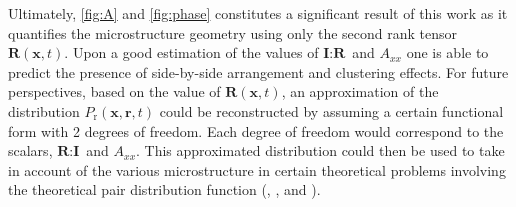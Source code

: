 Ultimately, \ref{fig:A} and \ref{fig:phase} constitutes a significant result of this work as it quantifies the microstructure geometry using only the second rank tensor $\textbf{R}(\textbf{x},t)$.
Upon a good estimation of the values of $\textbf{I}:\textbf{R}$ and $A_{xx}$ one is able to predict the presence of side-by-side arrangement and clustering effects. 
For future perspectives, based on the value of $\textbf{R}(\textbf{x},t)$, an approximation of the distribution $P_\text{r}(\textbf{x},\textbf{r},t)$ could be reconstructed by assuming a certain functional form with 2 degrees of freedom.
Each degree of freedom would correspond to the scalars, $\textbf{R}:\textbf{I}$ and $A_{xx}$.
This approximated distribution could then be used to take in account of the various microstructure in certain theoretical problems involving the theoretical pair distribution function (\citet{batchelor1972sedimentation}, \citet{hinch1977averaged}, and \citet{zhang2021ensemble}).

